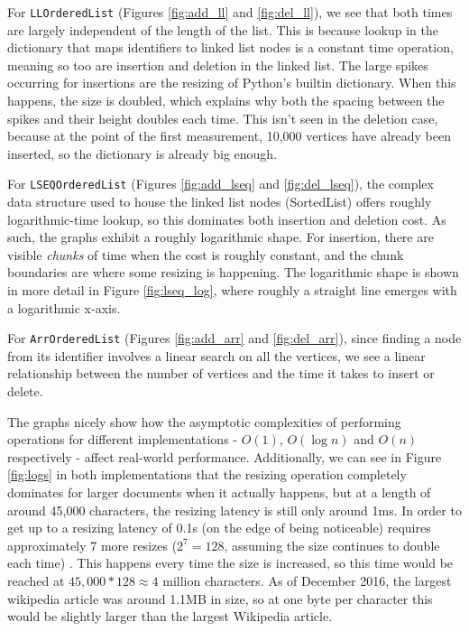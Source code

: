 \documentclass[diss.tex]{subfiles}
\begin{document}
For \texttt{LLOrderedList} (Figures \ref{fig:add_ll} and \ref{fig:del_ll}), we see that both times are largely independent of the length of the list. This is because lookup in the dictionary that maps identifiers to linked list nodes is a constant time operation, meaning so too are insertion and deletion in the linked list. The large spikes occurring for insertions are the resizing of Python's builtin dictionary. When this happens, the size is doubled, which explains why both the spacing between the spikes and their height doubles each time. This isn't seen in the deletion case, because at the point of the first measurement, 10,000 vertices have already been inserted, so the dictionary is already big enough.

For \texttt{LSEQOrderedList} (Figures \ref{fig:add_lseq} and \ref{fig:del_lseq}), the complex data structure used to house the linked list nodes (SortedList) offers roughly logarithmic-time lookup, so this dominates both insertion and deletion cost. As such, the graphs exhibit a roughly logarithmic shape. For insertion, there are visible \textit{chunks} of time when the cost is roughly constant, and the chunk boundaries are where some resizing is happening. The logarithmic shape is shown in more detail in Figure \ref{fig:lseq_log}, where roughly a straight line emerges with a logarithmic x-axis.

For \texttt{ArrOrderedList} (Figures \ref{fig:add_arr} and \ref{fig:del_arr}), since finding a node from its identifier involves a linear search on all the vertices, we see a linear relationship between the number of vertices and the time it takes to insert or delete.

The graphs nicely show how the asymptotic complexities of performing operations for different implementations - $O(1)$, $O(\log n)$ and $O(n)$ respectively - affect real-world performance. Additionally, we can see in Figure \ref{fig:logs} in both implementations that the resizing operation completely dominates for larger documents when it actually happens, but at a length of around 45,000 characters, the resizing latency is still only around 1ms. In order to get up to a resizing latency of 0.1s (on the edge of being noticeable) requires approximately 7 more resizes ($2^7=128$, assuming the size continues to double each time) . This happens every time the size is increased, so this time would be reached at $45,000 * 128 \approx 4$ million characters. As of December 2016, the largest wikipedia article was around 1.1MB in size, so at one byte per character this would be slightly larger than the largest Wikipedia article.
\end{document}
